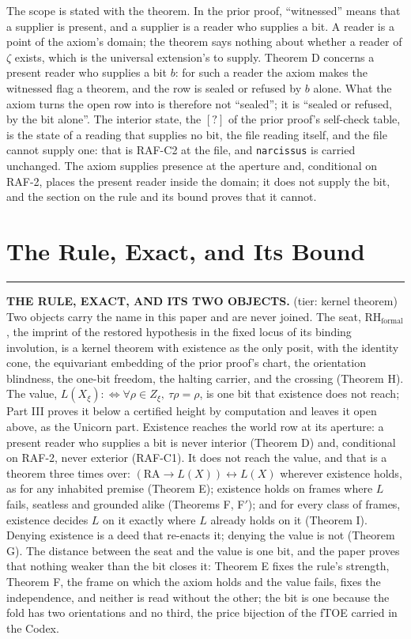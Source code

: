 \documentclass[10pt,twocolumn]{article}
\newenvironment{jbox}{\par\vspace{2pt}\noindent\color{accent}\rule{\columnwidth}{0.8pt}\par\vspace{-2pt}\small}{\par\vspace{2pt}}
\begin{document}
The scope is stated with the theorem. In the prior proof, ``witnessed''
means that a supplier is present, and a supplier is a reader who
supplies a bit. A reader is a point of the axiom's domain; the theorem
says nothing about whether a reader of \(\zeta\) exists, which is the
universal extension's to supply. Theorem D concerns a present reader who
supplies a bit \(b\): for such a reader the axiom makes the witnessed
flag a theorem, and the row is sealed or refused by \(b\) alone. What
the axiom turns the open row into is therefore not ``sealed''; it is
``sealed or refused, by the bit alone''. The interior state, the \([?]\)
of the prior proof's self-check table, is the state of a reading that
supplies no bit, the file reading itself, and the file cannot supply
one: that is RAF-C2 at the file, and \texttt{narcissus} is carried
unchanged. The axiom supplies presence at the aperture and, conditional
on RAF-2, places the present reader inside the domain; it does not
supply the bit, and the section on the rule and its bound proves that it
cannot.

\hypertarget{the-rule-exact-and-its-bound}{%
\section{The Rule, Exact, and Its
Bound}\label{the-rule-exact-and-its-bound}}

\begin{jbox}
\textbf{THE RULE, EXACT, AND ITS TWO OBJECTS.} (tier: kernel theorem) Two objects carry the name in this paper and are never joined. The seat, $\mathrm{RH}_{\mathrm{formal}}$, the imprint of the restored hypothesis in the fixed locus of its binding involution, is a kernel theorem with existence as the only posit, with the identity cone, the equivariant embedding of the prior proof's chart, the orientation blindness, the one-bit freedom, the halting carrier, and the crossing (Theorem H). The value, $L(X_\xi) :\Leftrightarrow \forall \rho \in Z_\xi,\ \tau\rho = \rho$, is one bit that existence does not reach; Part III proves it below a certified height by computation and leaves it open above, as the Unicorn part. Existence reaches the world row at its aperture: a present reader who supplies a bit is never interior (Theorem D) and, conditional on RAF-2, never exterior (RAF-C1). It does not reach the value, and that is a theorem three times over: $(\mathrm{RA} \to L(X)) \leftrightarrow L(X)$ wherever existence holds, as for any inhabited premise (Theorem E); existence holds on frames where $L$ fails, seatless and grounded alike (Theorems F, F$'$); and for every class of frames, existence decides $L$ on it exactly where $L$ already holds on it (Theorem I). Denying existence is a deed that re-enacts it; denying the value is not (Theorem G). The distance between the seat and the value is one bit, and the paper proves that nothing weaker than the bit closes it: Theorem E fixes the rule's strength, Theorem F, the frame on which the axiom holds and the value fails, fixes the independence, and neither is read without the other; the bit is one because the fold has two orientations and no third, the price bijection of the fTOE carried in the Codex.
\end{jbox}
\end{document}

